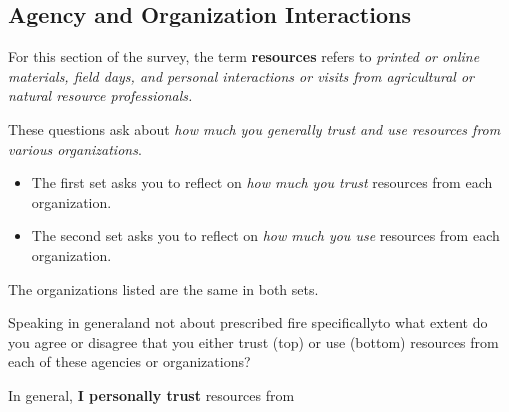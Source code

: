 \documentclass[
  english,
  ]{sdapsclassic}
\begin{document}
\begin{questionnaire}
    \section{Agency and Organization Interactions}
    
 For this section of the survey, the term \textbf{resources} refers to \emph{printed or online materials, field days, and personal interactions or visits from agricultural or natural resource professionals.}

These questions ask about \emph{how much you generally trust and use resources from various organizations}. 
	\begin{itemize}
		\item The first set asks you to reflect on \emph{how much you trust} resources from each organization. 
		\item The second set asks you to reflect on \emph{how much you use} resources from each organization.  
	\end{itemize}
The organizations listed are the same in both sets.

 Speaking in general\textemdash and not about prescribed fire specifically\textemdash to what extent do you agree or disagree that you either trust (top) or use (bottom) resources from each of these agencies or organizations?   

      \begin{markgroup}{In general, \textbf{I personally trust} resources from}
         {}~{}
         {}~{}
         {}~{}
         {}~{}
         {}~{}
         {}~{}
         {}~{}
         {}~{}
         {}~{}
         {}~{}
      \end{markgroup}
      

\end{questionnaire}
\end{document}
